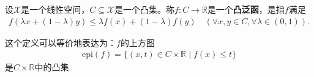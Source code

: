\documentclass[../../main.tex]{subfiles}%
\begin{document}
\begin{definition}[凸泛函]
设$\mathscr{X}$是一个线性空间，$C \subseteq \mathscr{X}$是一个凸集。称$f: C \to \mathbb{R}$是一个\textbf{凸泛函}，是指$f$满足
\begin{align*}
f(\lambda x + (1 - \lambda)y) \leqslant \lambda f(x) + (1 - \lambda)f(y) \quad (\forall x, y \in C, \forall \lambda \in (0,1)).
\end{align*}
\end{definition}
\begin{remark}
这个定义可以等价地表达为：$f$的上方图
\begin{align*}
\mathrm{epi}(f) = \{ (x,t) \in C \times \mathbb{R} \mid f(x) \leqslant t \}
\end{align*}
是$C \times \mathbb{R}$中的凸集.
\end{remark}
\end{document}
